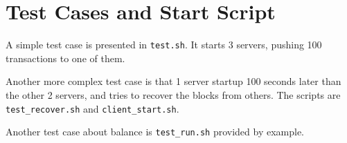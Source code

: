 \documentclass{article}
\begin{document}
\section{Test Cases and Start Script}
A simple test case is presented in \texttt{test.sh}. It starts 3 servers, pushing 100 transactions to one of them.

Another more complex test case is that 1 server startup 100 seconds later than the other 2 servers, and tries to recover the blocks from others. The scripts are 
\texttt{test\_recover.sh} and \texttt{client\_start.sh}.

Another test case about balance is \texttt{test\_run.sh} provided by example.
\end{document}
